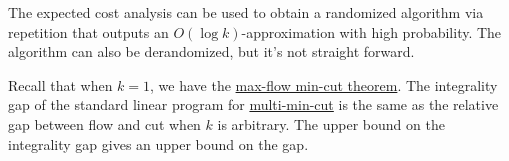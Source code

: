 \begin{note}
	The expected cost analysis can be used to obtain a randomized algorithm via repetition that outputs an \(O(\log k)\)-approximation with high probability. The algorithm can also be derandomized, but it's not straight forward.
\end{note}

\begin{remark}
	Recall that when \(k = 1\), we have the \hyperref[thm:max-flow-min-cut]{max-flow min-cut theorem}. The integrality gap of the standard linear program for \hyperref[prb:multi-min-cut]{multi-min-cut} is the same as the relative gap between flow and cut when \(k\) is arbitrary. The upper bound on the integrality gap gives an upper bound on the gap.
\end{remark}